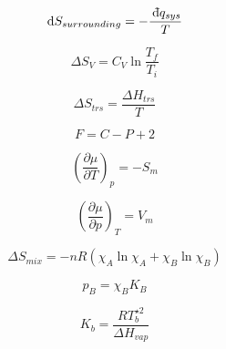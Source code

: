 \documentclass[12pt, letterpaper]{memoir}
\begin{document}
\begin{minipage}[t]{0.5\linewidth}
	\begin{equation*}
		\mathrm{d} S_{surrounding} = -\dfrac{~\dbar q_{sys}}{T}
	\end{equation*}

	\begin{equation*}
		\Delta S_V=C_V\ln\dfrac{T_f}{T_i}
	\end{equation*}

	\begin{equation*}
		\Delta S_{trs}=\dfrac{\Delta H_{trs}}{T}
	\end{equation*}

	\begin{equation*}
		F=C-P+2
	\end{equation*}

	\begin{equation*}
		\left(\dfrac{\partial \mu}{\partial T}\right)_p=-S_m
	\end{equation*}

	\begin{equation*}
		\left(\dfrac{\partial \mu}{\partial p}\right)_T=V_m
	\end{equation*}

	\begin{equation*}
		\Delta S_{mix} = -nR\left(\chi_A\ln\chi_A+\chi_B\ln\chi_B\right)
	\end{equation*}

	\begin{equation*}
		p_B=\chi_BK_B
	\end{equation*}

	\begin{equation*}
		K_b=\frac{RT^{\star 2}_b}{\Delta H_{vap}}
	\end{equation*}
\end{minipage}
\end{document}
